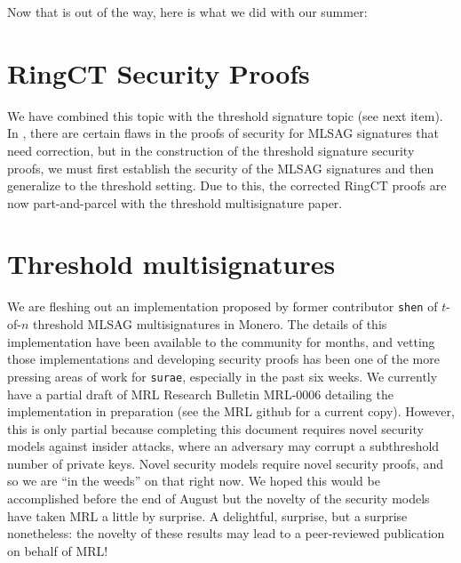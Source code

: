 \documentclass[12pt,english]{mrl}
\theoremstyle{definition}
\numberwithin{equation}{section}
\numberwithin{figure}{section}
\numberwithin{equation}{section}
\numberwithin{equation}{section}
\numberwithin{figure}{section}
\begin{document}
Now that is out of the way, here is what we did with our summer:


\section{RingCT Security Proofs} 

We have combined this topic with the threshold signature topic (see next item). In \cite{noether2016ring}, there are certain flaws in the proofs of security for MLSAG signatures that need correction, but in the construction of the threshold signature security proofs, we must first establish the security of the MLSAG signatures and then generalize to the threshold setting. Due to this, the corrected RingCT proofs are now part-and-parcel with the threshold multisignature paper.
    
    
\section{Threshold multisignatures} 

We are fleshing out an implementation proposed by former contributor \texttt{shen} of $t$-of-$n$ threshold MLSAG multisignatures in Monero. The details of this implementation have been available to the community for months, and vetting those implementations and developing security proofs has been one of the more pressing areas of work for \texttt{surae}, especially in the past six weeks. We currently have a partial draft of MRL Research Bulletin MRL-0006 detailing the implementation in preparation (see the MRL github for a current copy). However, this is only partial because completing this document requires novel security models against insider attacks, where an adversary may corrupt a subthreshold number of private keys. Novel security models require novel security proofs, and so we are ``in the weeds'' on that right now. We hoped this would be accomplished before the end of August but the novelty of the security models have taken MRL a little by surprise. A delightful, surprise, but a surprise nonetheless: the novelty of these results may lead to a peer-reviewed publication on behalf of MRL!
    
\end{document}

